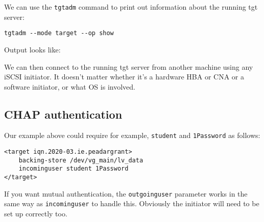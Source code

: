 We can use the \texttt{tgtadm} command to print out information about
the running tgt server:

\begin{verbatim}
tgtadm --mode target --op show
\end{verbatim}

Output looks like:

We can then connect to the running tgt server from another machine using
any iSCSI initiator. It doesn't matter whether it's a hardware HBA or
CNA or a software initiator, or what OS is involved.

\subsection{CHAP authentication}\label{chap-authentication}

Our example above could require for example, \texttt{student} and
\texttt{1Password} as follows:

\begin{verbatim}
<target iqn.2020-03.ie.peadargrant>
    backing-store /dev/vg_main/lv_data
    incominguser student 1Password
</target>
\end{verbatim}

If you want mutual authentication, the \texttt{outgoinguser} parameter
works in the same way as \texttt{incominguser} to handle this. Obviously
the initiator will need to be set up correctly too.
